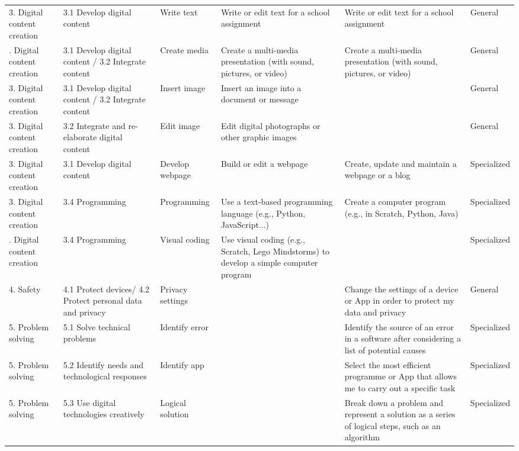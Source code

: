 \documentclass[
  letterpaper,
  DIV=11,
  numbers=noendperiod]{scrartcl}
\begin{document}
\begin{longtable}[t]{llllll}
3. Digital content creation & 3.1 Develop digital content & Write text & Write or edit text for a school assignment & Write or edit text for a school assignment & General\\
\addlinespace
3. Digital content creation & 3.1 Develop digital content / 3.2 Integrate content & Create media & Create a multi-media presentation (with sound, pictures, or video) & Create a multi-media presentation (with sound, pictures, or video) & General\\
3. Digital content creation & 3.1 Develop digital content / 3.2 Integrate content & Insert image & Insert an image into a document or message &  & General\\
3. Digital content creation & 3.2 Integrate and re-elaborate digital content & Edit image & Edit digital photographs or other graphic images &  & General\\
3. Digital content creation & 3.1 Develop digital content & Develop webpage & Build or edit a webpage & Create, update and maintain a webpage or a blog & Specialized\\
3. Digital content creation & 3.4 Programming & Programming & Use a text-based programming language (e.g., Python, JavaScript...) & Create a computer program (e.g., in Scratch, Python, Java) & Specialized\\
\addlinespace
3. Digital content creation & 3.4 Programming & Visual coding & Use visual coding (e.g., Scratch, Lego Mindstorms) to develop a simple computer program &  & Specialized\\
4. Safety & 4.1 Protect devices/ 4.2 Protect personal data and privacy & Privacy settings &  & Change the settings of a device or App in order to protect my data and privacy & General\\
5. Problem solving & 5.1 Solve technical problems & Identify error &  & Identify the source of an error in a software after considering a list of potential causes & Specialized\\
5. Problem solving & 5.2 Identify needs and technological responses & Identify app &  & Select the most efficient programme or App that allows me to carry out a specific task & Specialized\\
5. Problem solving & 5.3 Use digital technologies creatively & Logical solution &  & Break down a problem and represent a solution as a series of logical steps, such as an algorithm & Specialized\\
\bottomrule

\end{longtable}
\end{document}
